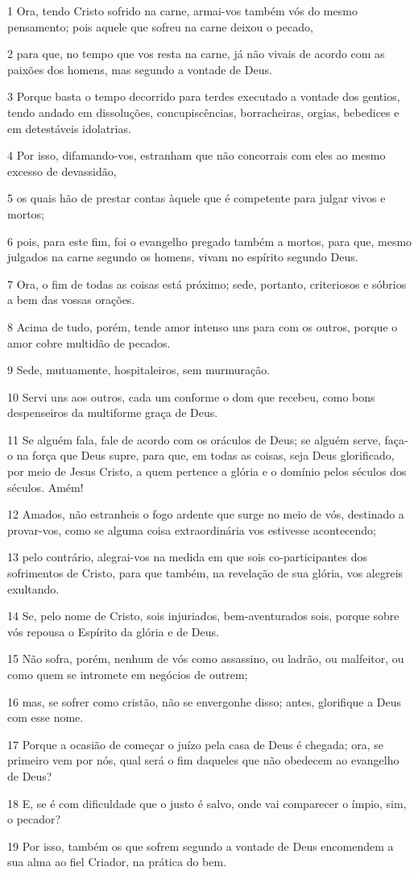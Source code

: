\par 1 Ora, tendo Cristo sofrido na carne, armai-vos também vós do mesmo pensamento; pois aquele que sofreu na carne deixou o pecado,
\par 2 para que, no tempo que vos resta na carne, já não vivais de acordo com as paixões dos homens, mas segundo a vontade de Deus.
\par 3 Porque basta o tempo decorrido para terdes executado a vontade dos gentios, tendo andado em dissoluções, concupiscências, borracheiras, orgias, bebedices e em detestáveis idolatrias.
\par 4 Por isso, difamando-vos, estranham que não concorrais com eles ao mesmo excesso de devassidão,
\par 5 os quais hão de prestar contas àquele que é competente para julgar vivos e mortos;
\par 6 pois, para este fim, foi o evangelho pregado também a mortos, para que, mesmo julgados na carne segundo os homens, vivam no espírito segundo Deus.
\par 7 Ora, o fim de todas as coisas está próximo; sede, portanto, criteriosos e sóbrios a bem das vossas orações.
\par 8 Acima de tudo, porém, tende amor intenso uns para com os outros, porque o amor cobre multidão de pecados.
\par 9 Sede, mutuamente, hospitaleiros, sem murmuração.
\par 10 Servi uns aos outros, cada um conforme o dom que recebeu, como bons despenseiros da multiforme graça de Deus.
\par 11 Se alguém fala, fale de acordo com os oráculos de Deus; se alguém serve, faça-o na força que Deus supre, para que, em todas as coisas, seja Deus glorificado, por meio de Jesus Cristo, a quem pertence a glória e o domínio pelos séculos dos séculos. Amém!
\par 12 Amados, não estranheis o fogo ardente que surge no meio de vós, destinado a provar-vos, como se alguma coisa extraordinária vos estivesse acontecendo;
\par 13 pelo contrário, alegrai-vos na medida em que sois co-participantes dos sofrimentos de Cristo, para que também, na revelação de sua glória, vos alegreis exultando.
\par 14 Se, pelo nome de Cristo, sois injuriados, bem-aventurados sois, porque sobre vós repousa o Espírito da glória e de Deus.
\par 15 Não sofra, porém, nenhum de vós como assassino, ou ladrão, ou malfeitor, ou como quem se intromete em negócios de outrem;
\par 16 mas, se sofrer como cristão, não se envergonhe disso; antes, glorifique a Deus com esse nome.
\par 17 Porque a ocasião de começar o juízo pela casa de Deus é chegada; ora, se primeiro vem por nós, qual será o fim daqueles que não obedecem ao evangelho de Deus?
\par 18 E, se é com dificuldade que o justo é salvo, onde vai comparecer o ímpio, sim, o pecador?
\par 19 Por isso, também os que sofrem segundo a vontade de Deus encomendem a sua alma ao fiel Criador, na prática do bem.

